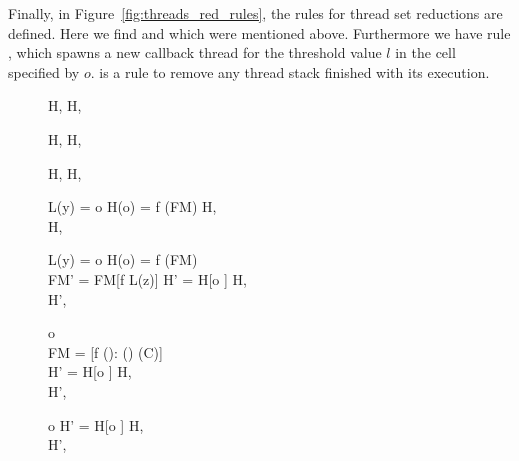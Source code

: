 Finally, in Figure~\ref{fig:threads_red_rules}, the rules for thread set
reductions are defined. Here we find \EFSProp{} and \EErrorP{} which were
mentioned above. Furthermore we have rule \ESpawn{}, which spawns a new callback
thread for the threshold value $l$ in the cell specified by $o$. \ETerm{} is a
rule to remove any thread stack finished with its execution.

\begin{figure}[h]
  {H,  \; \FRedTo \; H, }

  \RuleSpace{}

  {H,  \; \FRedTo \; H, }

  \RuleSpace{}

  {H,  \; \FRedTo \; H, }

  \RuleSpace{}

  {L(y) = o \andalso H(o) =  \andalso f \in \dom(FM)}
  {H,  \; \FRedTo  \\ 
  H, }

  \RuleSpace{}

  {L(y) = o \andalso H(o) =  \andalso f \in \dom(FM) \\
  FM' = FM[f \mapsto L(z)] \andalso H' = H[o \mapsto {}]}
  {H,  \; \FRedTo \\
   H', }

  \RuleSpace{}

  {o \\
  FM = [f \mapsto {}(\sigma): () \in \fdecls(C)] \\
  H' = H[o \mapsto {}]}
  {H,  \; \FRedTo \\
  H', }
  
  \RuleSpace{}

  {o \andalso
  H' = H[o \mapsto \Cell{\emptyset, \bot_{\LatVals{}}}]}
  {H,  \; \FRedTo \\
  H', }

  \RuleSpace{}
  

\end{figure}
